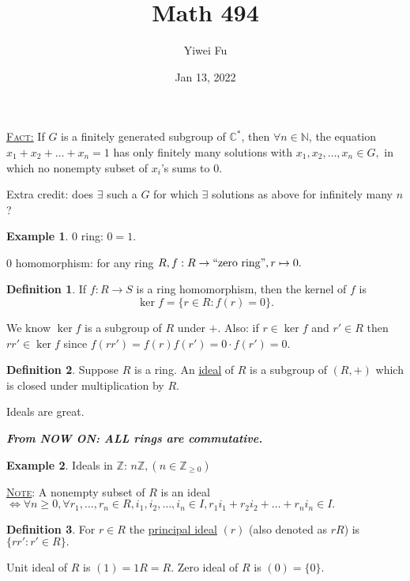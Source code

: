 \documentclass{article}
\newcommand{\C}{\mathbb{C}}
\newcommand{\Z}{\mathbb{Z}}
\newcommand{\N}{\mathbb{N}}
\newcommand{\fancyem}[1]{\underline{\textsc{#1}}}
\theoremstyle{definition}
\newtheorem{definition}{Definition}[section]
\newtheorem{example}{Example}[section]
\theoremstyle{remark}
\begin{document}
\renewcommand{\ref}[1]{\autoref{#1}}
\title{Math 494}
\author{Yiwei Fu}
\date{Jan 13, 2022}
\maketitle

\section{}
\fancyem{Fact:} If $G$ is a finitely generated subgroup of $\C^*$, then $\forall n \in \N$, the equation $x_1 + x_2 + \ldots + x_n = 1$ has only finitely many solutions with $x_1, x_2, \ldots, x_n \in G,$ in which no nonempty subset of $x_i$'s sums to $0$.

Extra credit: does $\exists$ such a $G$ for which $\exists$ solutions as above for infinitely many $n$?

\begin{example}
$0$ ring: $0 = 1.$

$0$ homomorphism: for any ring $R, f: R \to ``\text{zero ring}", r \mapsto 0.$
\end{example}

\begin{definition}
If $f: R \to S$ is a ring homomorphism, then the kernel of $f$ is \[\ker{f} = \{r \in R: f(r) = 0\}.\]
\end{definition}
We know $\ker{f}$ is a subgroup of $R$ under $+.$ Also: if $r \in \ker{f}$ and $r' \in R$ then $rr' \in \ker{f}$ since $f(rr') = f(r)f(r') = 0 \cdot f(r') = 0.$ 

\begin{definition}
Suppose $R$ is a ring. An \underline{ideal} of $R$ is a subgroup of $(R, +)$ which is closed under multiplication by $R.$
\end{definition}
Ideals are great.

\textbf{\emph{From NOW ON: ALL rings are commutative.}}

\begin{example}
Ideals in $\Z$: $n\Z, (n \in \Z_{\geq 0})$
\end{example}
\fancyem{Note}: A nonempty subset of $R$ is an ideal $\iff \forall n \geq 0, \forall r_1, \ldots, r_n \in R, i_1, i_2, \ldots, i_n \in I, r_1i_1 + r_2i_2 + \ldots + r_ni_n \in I.$

\begin{definition}
For $r \in R$ the \underline{principal ideal} $(r)$ (also denoted as $rR$) is $\{rr': r' \in R\}.$
\end{definition}
Unit ideal of $R$ is $(1) = 1R = R.$
Zero ideal of $R$ is $(0) = \{0\}.$
\end{document}
